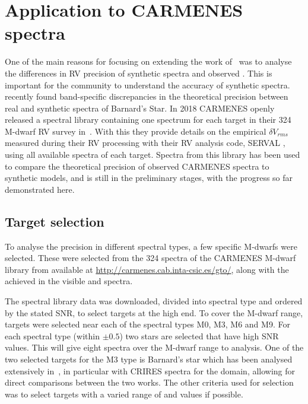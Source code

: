 
\section{Application to {CARMENES} spectra}

One of the main reasons for focusing on extending the work of~\citet{figueira_radial_2016} was to analyse the differences in {RV} precision of synthetic spectra and observed \nir{}.
This is important for the community to understand the accuracy of synthetic spectra.
\citet{artigau_optical_2018} recently found band-specific discrepancies in the theoretical precision between real and synthetic \nir{} spectra of Barnard's Star.
In 2018 {CARMENES} openly released a spectral library containing one spectrum for each target in their 324 M-dwarf {RV} survey in~\citet{reiners_carmenes_2018}.
With this they provide details on the empirical \(\delta V_{rms}\) measured during their {RV} processing with their {RV} analysis code, {SERVAL} \citep{zechmeister_spectrum_2018}, using all available spectra of each target.
Spectra from this library has been used to compare the theoretical precision of observed {CARMENES} spectra to synthetic models, and is still in the preliminary stages, with the progress so far demonstrated here.

\subsection{Target selection}
\label{subsec:carmense_targets}
To analyse the precision in different spectral types, a few specific M-dwarfs were selected.
These were selected from the 324 spectra of the {CARMENES} M-dwarf library from \citet{reiners_carmenes_2018} available at \href{http://carmenes.cab.inta-csic.es/gto/}{http://carmenes.cab.inta-csic.es/gto/}, along with the achieved \snr{} in the visible and \nir{} spectra.

The spectral library data was downloaded, divided into spectral type and ordered by the stated \nir{} {SNR}, to select targets at the high \snr{} end.
To cover the M-dwarf range, targets were selected near each of the spectral types M0, M3, M6 and M9.
For each spectral type (within $\pm0.5$) two stars are selected that have high {SNR} values. This will give eight spectra over the M-dwarf range to analysis.
One of the two selected targets for the M3 type is Barnard's star which has been analysed extensively in~\citet{artigau_optical_2018}, in particular with CRIRES spectra for the \nir{} domain, allowing for direct comparisons between the two works.
The other criteria used for selection was to select targets with a varied range of \Logg{} and \feh{} values if possible.

